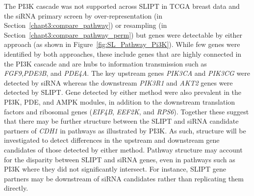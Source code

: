 \begin{figure*}[!htb]
  \begin{center}
   }
   \end{center}
   \caption[synthetic lethality in the PI3K cascade]{\small \textbf{synthetic lethality in the PI3K cascade.} The Reactome PI3K Cascade pathway with \gls{synthetic lethal} candidates coloured as shown in the legend.
}
\label{fig:SL_Pathway_Pi3K}
\end{figure*}

The \gls{PI3K} cascade was not supported across \gls{SLIPT} in \gls{TCGA} breast  data and the \gls{siRNA} primary screen by over-representation (in Section~\ref{chapt3:compare_pathway}) or resampling (in Section~\ref{chapt3:compare_pathway_perm}) but genes were detectable by either approach (as shown in Figure~\ref{fig:SL_Pathway_Pi3K}).  While few genes were identified by both approaches, these include genes that are highly connected in the PI3K cascade and are hubs to information transmission such as \textit{FGF9},\textit{PDE3B}, and \textit{PDE4A}. The key upstream genes \textit{PIK3CA} and \textit{PIK3CG} were detected by \gls{siRNA} whereas the downstream \textit{PIK3R1} and \textit{AKT2} genes were detected by \gls{SLIPT}. Gene detected by either method were also prevalent in the \gls{PI3K}, \gls{PDE}, and \gls{AMPK} modules, in addition to the downstream translation factors and ribosomal genes (\textit{EIF4B}, \textit{EEF2K}, and \textit{RPS6}). Together these suggest that there may be further structure between the \gls{SLIPT} and \gls{siRNA} candidate partners of \textit{CDH1} in pathways as illustrated by \gls{PI3K}. As such,  structure will be investigated to detect differences in the upstream and downstream gene candidates of those detected by either method. Pathway structure may account for the disparity between \gls{SLIPT} and \gls{siRNA} genes, even in pathways such as PI3K where they did not significantly intersect. For instance, \gls{SLIPT} gene partners may be downstream of \gls{siRNA} candidates rather than replicating them directly.

